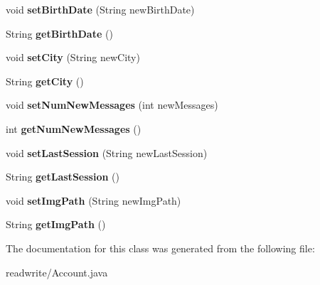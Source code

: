\begin{DoxyCompactItemize}
\item 
\mbox{\label{class_account_adb742c829886ec9f1c7a9781f8147144}} 
void {\bfseries set\+Birth\+Date} (String new\+Birth\+Date)
\item 
\mbox{\label{class_account_a087047fb3e3026692e86b8a7eb9b90a1}} 
String {\bfseries get\+Birth\+Date} ()
\item 
\mbox{\label{class_account_a0eb38b6247bfe94fb5f785fe29b0d5e8}} 
void {\bfseries set\+City} (String new\+City)
\item 
\mbox{\label{class_account_aa77cd9c25b58a8b332487c9033bcb3de}} 
String {\bfseries get\+City} ()
\item 
\mbox{\label{class_account_a50e909ccd2308b836a2eca9472986b1d}} 
void {\bfseries set\+Num\+New\+Messages} (int new\+Messages)
\item 
\mbox{\label{class_account_ab2243182691761884cd3a5e9672d9b3c}} 
int {\bfseries get\+Num\+New\+Messages} ()
\item 
\mbox{\label{class_account_af68df6233ed4805b65aea1c9e97e7127}} 
void {\bfseries set\+Last\+Session} (String new\+Last\+Session)
\item 
\mbox{\label{class_account_a2be799e4793ee03a7a4982d4f3abe35a}} 
String {\bfseries get\+Last\+Session} ()
\item 
\mbox{\label{class_account_ad27c4e798799d5f3b774db86f7ecd446}} 
void {\bfseries set\+Img\+Path} (String new\+Img\+Path)
\item 
\mbox{\label{class_account_ad38a28ac366904c43deb3b9c7a1ba97b}} 
String {\bfseries get\+Img\+Path} ()
\end{DoxyCompactItemize}


The documentation for this class was generated from the following file\+:\begin{DoxyCompactItemize}
\item 
readwrite/Account.\+java\end{DoxyCompactItemize}
